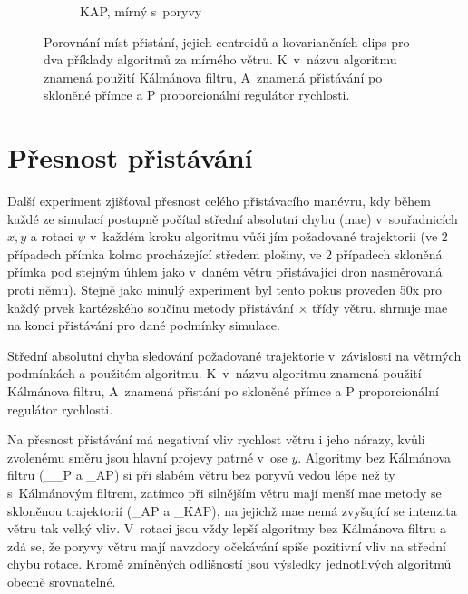 \begin{figure}[H]
\begin{subfigure}[b]{0.495\textwidth}
        \caption{KAP, mírný s~poryvy}
      \end{subfigure}
      \caption[Příklad porovnání přistání]{Porovnání míst přistání, jejich centroidů a kovariančních elips pro dva příklady algoritmů za mírného větru. K~v~názvu algoritmu znamená použití Kálmánova filtru, A~znamená přistávání po skloněné přímce a P proporcionální regulátor rychlosti.}
      \label{fig:presnostPristani}
    \end{figure}
  
  \section{Přesnost přistávání} \label{sec:presnostPristavani}
    Další experiment zjišťoval přesnost celého přistávacího manévru, kdy během každé ze simulací postupně počítal střední absolutní chybu (\acrshort{mae}) v~souřadnicích $x, y$ a rotaci $\psi$ v~každém kroku algoritmu vůči jím požadované trajektorii (ve 2 případech přímka kolmo procházející středem plošiny, ve 2 případech skloněná přímka pod stejným úhlem jako v~daném větru přistávající dron nasměrovaná proti němu). Stejně jako minulý experiment byl tento pokus proveden 50x pro každý prvek kartézského součinu metody přistávání $\times$ třídy větru.  shrnuje \acrshort{mae} na konci přistávání pro dané podmínky simulace.

    \begin{table}
      \centering
      
      \caption[Střední absolutní chyba přistávání]{Střední absolutní chyba sledování požadované trajektorie v~závislosti na větrných podmínkách a použitém algoritmu. K~v~názvu algoritmu znamená použití Kálmánova filtru, A~znamená přistání po skloněné přímce a P proporcionální regulátor rychlosti.}
      \label{tab:mae}
    \end{table}

    Na přesnost přistávání má negativní vliv rychlost větru i jeho nárazy, kvůli zvolenému směru jsou hlavní projevy patrné v~ose $y$. Algoritmy bez Kálmánova filtru (\_\_P a \_AP) si při slabém větru bez poryvů vedou lépe než ty s~Kálmánovým filtrem, zatímco při silnějším větru mají menší \acrshort{mae} metody se skloněnou trajektorií (\_AP a \_KAP), na jejichž \acrshort{mae} nemá zvyšující se intenzita větru tak velký vliv. V~rotaci jsou vždy lepší algoritmy bez Kálmánova filtru a zdá se, že poryvy větru mají navzdory očekávání spíše pozitivní vliv na střední chybu rotace. Kromě zmíněných odlišností jsou výsledky jednotlivých algoritmů obecně srovnatelné.
